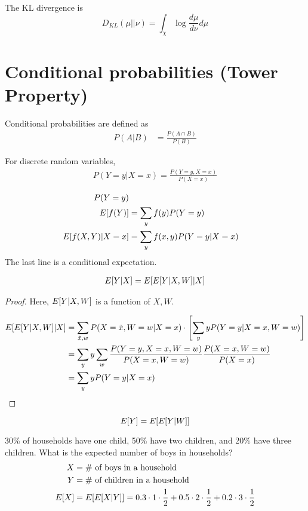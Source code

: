 \documentclass[twoside]{article}
\begin{document}
\begin{definition}
  The KL divergence is
  \[ D_{KL}(\mu || \nu) = \int_\chi \log \frac{d\mu}{d\nu} d\mu \]
\end{definition}

\section{Conditional probabilities (Tower Property)}

Conditional probabilities are defined as
\begin{align*}
  P(A | B) &= \frac{P(A \cap B)}{P(B)} 
\end{align*}

For discrete random variables,
\begin{align*}
  P(Y = y | X = x) = \frac{P(Y = y, X = x)}{P(X = x)}
\end{align*}

\begin{align*}
  P(Y = y) \\
  E[f(Y)] &= \sum_y f(y) P(Y = y) \\
  E[f(X, Y) | X = x] &= \sum_y f(x, y) P(Y = y | X = x)
\end{align*}
The last line is a conditional expectation.

\begin{theorem}
\begin{align*}
  E[Y | X] = E[E[Y | X, W] | X]
\end{align*}
\end{theorem}
\begin{proof}
  Here, $E[Y | X, W]$ is a function of $X, W$. 

  \begin{align*}
    E[E[Y | X, W] | X] &= \sum_{\tilde{x}, w} P(X = \tilde{x}, W = w | X = x)
    \cdot \left[ \sum_y yP(Y = y | X = x, W = w)\right] \\
    &= \sum_y y \sum_w \frac{P(Y = y, X = x, W = w)}{P(X = x, W = w)}  \frac{P(X =
    x, W = w)}{P(X = x)} \\
    &= \sum_y y P(Y = y | X = x)
  \end{align*}
\end{proof}
\begin{corollary}
  \[E[Y] = E[E[Y | W]]\]
\end{corollary}

\begin{example}
30\% of households have one child, 50\% have two children, and 20\% have
three children. What is the expected number of boys in households?
\begin{align*}
  X &= \text{\# of boys in a household} \\
  Y &= \text{\# of children in a household} \\
  E[X] &= E[E[X | Y]]= 0.3 \cdot 1 \cdot \frac{1}{2} + 0.5 \cdot 2 \cdot 
  \frac{1}{2} + 0.2 \cdot 3 \cdot \frac{1}{2}
\end{align*}
\end{example}
\end{document}
